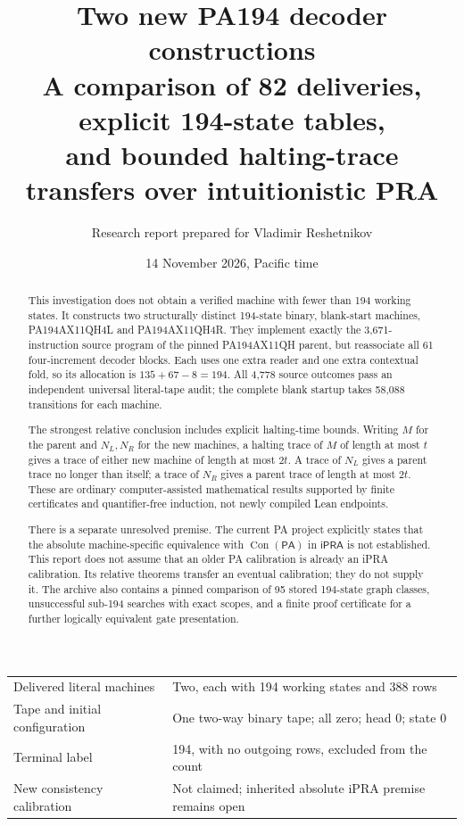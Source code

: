 \documentclass[10pt,letterpaper]{article}
\title{\textbf{Two new PA194 decoder constructions}\\[5pt]
\large A comparison of 82 deliveries, explicit 194-state tables,\\
and bounded halting-trace transfers over intuitionistic PRA}
\author{Research report prepared for Vladimir Reshetnikov}
\date{14 November 2026, Pacific time}
\newcommand{\ipra}{\mathsf{iPRA}}
\newcommand{\pa}{\mathsf{PA}}
\newcommand{\Con}{\operatorname{Con}}
\begin{document}
\maketitle
\begin{abstract}
This investigation does not obtain a verified machine with fewer than 194
working states. It constructs two structurally distinct 194-state binary,
blank-start machines, PA194AX11QH4L and PA194AX11QH4R. They implement exactly
the 3,671-instruction source program of the pinned PA194AX11QH parent, but
reassociate all 61 four-increment decoder blocks. Each uses one extra reader
and one extra contextual fold, so its allocation is $135+67-8=194$.
All 4,778 source outcomes pass an independent universal literal-tape audit;
the complete blank startup takes 58,088 transitions for each machine.

The strongest relative conclusion includes explicit halting-time bounds.
Writing $M$ for the parent and $N_L,N_R$ for the new machines, a halting trace
of $M$ of length at most $t$ gives a trace of either new machine of length
at most $2t$. A trace of $N_L$ gives a parent trace no longer than itself;
a trace of $N_R$ gives a parent trace of length at most $2t$. These are ordinary
computer-assisted mathematical results supported by finite certificates
and quantifier-free induction, not newly compiled Lean endpoints.

There is a separate unresolved premise. The current PA project explicitly
states that the absolute machine-specific equivalence with $\Con(\pa)$ in
$\ipra$ is not established. This report does not assume that an older PA
calibration is already an iPRA calibration. Its relative theorems transfer
an eventual calibration; they do not supply it. The archive also contains
a pinned comparison of 95 stored 194-state graph classes, unsuccessful
sub-194 searches with exact scopes, and a finite proof certificate for a
further logically equivalent gate presentation.
\end{abstract}

\begin{center}
\begin{tabular}{@{}ll@{}}
\toprule
Delivered literal machines & Two, each with 194 working states and 388 rows\\
Tape and initial configuration & One two-way binary tape; all zero; head 0; state 0\\
Terminal label & 194, with no outgoing rows, excluded from the count\\
New consistency calibration & Not claimed; inherited absolute iPRA premise remains open\\
\bottomrule
\end{tabular}
\end{center}
\clearpage
\tableofcontents
\clearpage
\end{document}
